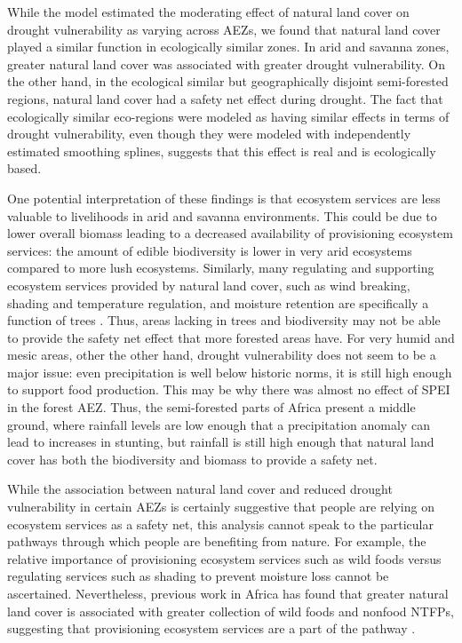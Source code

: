 \documentclass{article}
\begin{document}
While the model estimated the moderating effect of natural land cover on drought vulnerability as varying across AEZs, we found that natural land cover played a similar function in ecologically similar zones.  In arid and savanna zones, greater natural land cover was associated with greater drought vulnerability.  On the other hand, in the ecological similar but geographically disjoint semi-forested regions, natural land cover had a safety net effect during drought.  The fact that ecologically similar eco-regions were modeled as having similar effects in terms of drought vulnerability, even though they were modeled with independently estimated smoothing splines, suggests that this effect is real and is ecologically based.

One potential interpretation of these findings is that ecosystem services are less valuable to livelihoods in arid and savanna environments.  This could be due to lower overall biomass leading to a decreased availability of provisioning ecosystem services: the amount of edible biodiversity is lower in very arid ecosystems compared to more lush ecosystems.  Similarly, many regulating and supporting ecosystem services provided by natural land cover, such as wind breaking, shading and temperature regulation, and moisture retention are specifically a function of trees \cite{Reed2016}. Thus, areas lacking in trees and biodiversity may not be able to provide the safety net effect that more forested areas have.  For very humid and mesic areas, other the other hand, drought vulnerability does not seem to be a major issue: even precipitation is well below historic norms, it is still high enough to support food production.  This may be why there was almost no effect of SPEI in the forest AEZ.  Thus, the semi-forested parts of Africa present a middle ground, where rainfall levels are low enough that a precipitation anomaly can lead to increases in stunting, but rainfall is still high enough that natural land cover has both the biodiversity and biomass to provide a safety net.

While the association between natural land cover and reduced drought vulnerability in certain AEZs is certainly suggestive that people are relying on ecosystem services as a safety net, this analysis cannot speak to the particular pathways through which people are benefiting from nature.  For example, the relative importance of provisioning ecosystem services such as wild foods versus regulating services such as shading to prevent moisture loss cannot be ascertained.  Nevertheless, previous work in Africa has found that greater natural land cover is associated with greater collection of wild foods and nonfood NTFPs, suggesting that provisioning ecosystem services are a part of the pathway \cite{Cooper2018a}.
\end{document}
